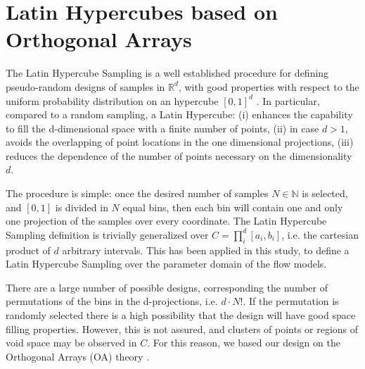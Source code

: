 \documentclass{article}
\newtheorem{definition}[theorem]{Definition}
\begin{document}
\appendix
\section{Latin Hypercubes based on Orthogonal Arrays}\label{A-1}
The Latin Hypercube Sampling is a well established procedure for defining pseudo-random designs of samples in $\mathbb R^d$, with good properties with respect to the uniform probability distribution on an hypercube $[0,1]^d$ \citep{McKay1979,Owen1992b,Stein1987,Ranjan2014,Mingyao2016}. In particular, compared to a random sampling, a Latin Hypercube: (i) enhances the capability to fill the d-dimensional space with a finite number of points, (ii) in case $d>1$, avoids the overlapping of point locations in the one dimensional projections, (iii) reduces the dependence of the number of points necessary on the dimensionality $d$.


The procedure is simple: once the desired number of samples $N\in\mathbb N$ is selected, and $[0,1]$ is divided in $N$ equal bins, then each bin will contain one and only one projection of the samples over every coordinate. The Latin Hypercube Sampling definition is trivially generalized over $C=\prod^d_i [a_i, b_i]$, i.e. the cartesian product of $d$ arbitrary intervals. This has been applied in this study, to define a Latin Hypercube Sampling over the parameter domain of the flow models.

There are a large number of possible designs, corresponding the number of permutations of the bins in the d-projections, i.e. $d\cdot N!$. If the permutation is randomly selected there is a high possibility that the design will have good space filling properties. However, this is not assured, and clusters of points or regions of void space may be observed in $C$. For this reason, we based our design on the Orthogonal Arrays (OA) theory \citep{Owen1992a,Tang1993}.
\end{document}
